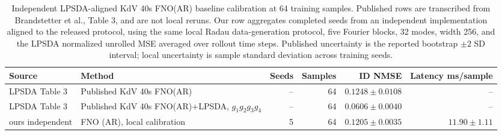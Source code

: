 \begin{table}[t]
\centering
\small
\caption{Independent LPSDA-aligned KdV 40s FNO(AR) baseline calibration at 64 training samples. Published rows are transcribed from Brandstetter et al., Table 3, and are not local reruns. Our row aggregates completed seeds from an independent implementation aligned to the released protocol, using the same local Radau data-generation protocol, five Fourier blocks, 32 modes, width 256, and the LPSDA normalized unrolled MSE averaged over rollout time steps. Published uncertainty is the reported bootstrap $\pm2$ SD interval; local uncertainty is sample standard deviation across training seeds.}
\label{tab:lpsda-kdv-faithful-baseline}
\begin{tabular}{llrrrr}
\toprule
Source & Method & Seeds & Samples & ID NMSE & Latency ms/sample \\
\midrule
LPSDA Table 3 & Published KdV 40s FNO(AR) & -- & 64 & \(0.1248\pm0.0108\) & -- \\
LPSDA Table 3 & Published KdV 40s FNO(AR)+LPSDA, \(g_1g_2g_3g_4\) & -- & 64 & \(0.0606\pm0.0040\) & -- \\
ours independent & FNO (AR), local calibration & 5 & 64 & \(0.1205\pm0.0035\) & \(11.90\pm1.11\) \\
\bottomrule
\end{tabular}
\end{table}
